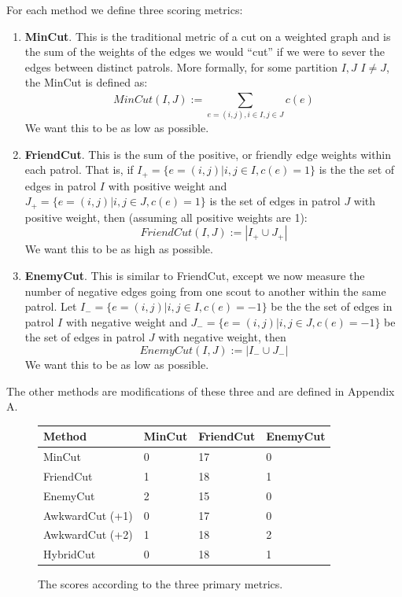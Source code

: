 \documentclass{amsart}
\theoremstyle{definition}
\theoremstyle{remark}
\numberwithin{equation}{section}
\begin{document}
For each method we define three scoring metrics:

\begin{enumerate}
\item \textbf{MinCut}. This is the traditional metric of a cut on a weighted graph and is the sum of the weights of the edges we would ``cut'' if we were to sever the edges between distinct patrols. More formally, for some partition $I, J$ $I \neq J$, the MinCut is defined as:
$$
MinCut(I, J) := \sum_{e = (i, j), i \in I, j \in J}^{} c(e)
$$
We want this to be as low as possible.
\item \textbf{FriendCut}. This is the sum of the positive, or friendly edge weights within each patrol. That is, if $I_+ = \{e=(i,j) | i,j \in I, c(e)=1\}$ is the the set of edges in patrol $I$ with positive weight and $J_+ = \{e=(i,j) | i,j \in J, c(e)=1\}$ is the set of edges in patrol $J$ with positive weight, then (assuming all positive weights are 1):
$$
FriendCut(I, J) :=  |I_+ \cup J_+|
$$
We want this to be as high as possible.
\item \textbf{EnemyCut}. This is similar to FriendCut, except we now measure the number of negative edges going from one scout to another within the same patrol. Let $I_- = \{e=(i,j) | i,j \in I, c(e)=-1\}$ be the the set of edges in patrol $I$ with negative weight and $J_- = \{e=(i,j) | i,j \in J, c(e)=-1\}$ be the set of edges in patrol $J$ with negative weight, then
$$
EnemyCut(I, J) := |I_- \cup J_-|
$$
    We want this to be as low as possible.
\end{enumerate}

The other methods are modifications of these three and are defined in Appendix A.

\begin{figure}[h]
    \centering
    \begin{tabular}{ |l|l|l|l| }
        \hline
        \textbf{Method} & \textbf{MinCut} & \textbf{FriendCut} & \textbf{EnemyCut} \\
        \hline
        MinCut & 0 & 17 & 0 \\
        FriendCut & 1 & 18 & 1 \\
        EnemyCut & 2 & 15 & 0 \\
        AwkwardCut (+1) & 0 & 17 & 0 \\
        AwkwardCut (+2) & 1 & 18 & 2 \\
        HybridCut & 0 & 18 & 1 \\
        \hline
    \end{tabular}
    \caption{The scores according to the three primary metrics.}
\end{figure}
\end{document}
